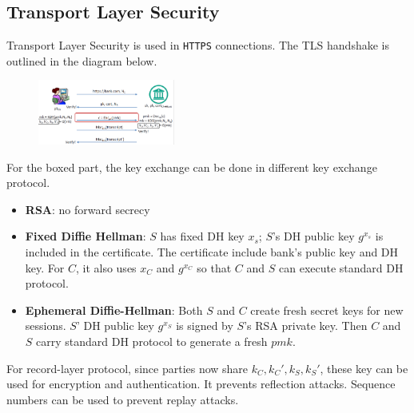 \documentclass[12pt]{article}
\theoremstyle{definition}
\begin{document}
\subsection{Transport Layer Security}
Transport Layer Security is used in \texttt{HTTPS} connections. The TLS handshake is outlined in the diagram below.
\begin{figure}[h]
\centering
\includegraphics[width=0.4\textwidth]{9.png}
\end{figure}
For the boxed part, the key exchange can be done in different key exchange protocol.
\begin{itemize}
  \item \textbf{RSA}: no forward secrecy
  \item \textbf{Fixed Diffie Hellman}: $S$ has fixed DH key $x_s$; $S$'s DH public key $g^{x_s}$ is included in the certificate. The certificate include bank's public key and DH key. For $C$, it also uses $x_C$ and $g^{x_C}$ so that $C$ and $S$ can execute standard DH protocol.
  \item \textbf{Ephemeral Diffie-Hellman}: Both $S$ and $C$ create fresh secret keys for new sessions. $S$' DH public key $g^{x_S}$ is signed by $S$'s RSA private key. Then $C$ and $S$ carry standard DH protocol to generate a fresh $pmk$.
\end{itemize}
For record-layer protocol, since parties now share $k_C,k_C', k_S, k_S'$, these key can be used for encryption and authentication. It prevents reflection attacks. Sequence numbers can be used to prevent replay attacks.
\end{document}
